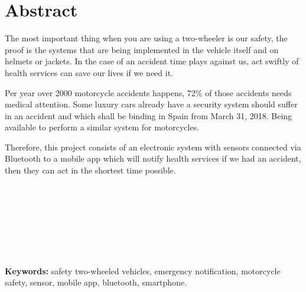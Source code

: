 	\chapter*{Abstract} %

	
	The most important thing when you are using a two-wheeler is our safety, the proof is the systems that are being implemented in the vehicle itself and on helmets or jackets. In the case of an accident time plays against us, act swiftly of health services can save our lives if we need it.
	
	Per year over 2000 motorcycle accidents happens, 72\% of those accidents needs medical attention. Some luxury cars already have a security system should suffer in an accident and which shall be binding in Spain from March 31, 2018. Being available to perform a similar system for motorcycles.
	
	Therefore, this project consists of an electronic system with sensors connected via Bluetooth to a mobile app which will notify health services if we had an accident, then they can act in the shortest time possible.
	
	\
	\\
	\\
	\\
	\\
	\\
	\\
	\\
	
	\textbf{Keywords:} safety two-wheeled vehicles, emergency notification, motorcycle safety, sensor, mobile app, bluetooth, smartphone.
	
	\newpage
	$\ $